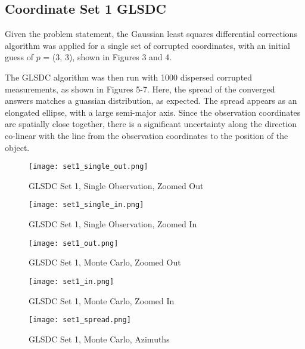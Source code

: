 \documentclass{article}
\begin{document}
\subsection{Coordinate Set 1 GLSDC}
Given the problem statement, the Gaussian least squares differential corrections algorithm was applied for a single set of corrupted coordinates, with an initial guess of \textbf{$p$} = (3, 3), shown in Figures 3 and 4. 
\par The GLSDC algorithm was then run with 1000 dispersed corrupted measurements, as shown in Figures 5-7. Here, the spread of the converged answers matches a guassian distribution, as expected. The spread appears as an elongated ellipse, with a large semi-major axis. Since the observation coordinates are spatially close together, there is a significant uncertainty along the direction co-linear with the line from the observation coordinates to the position of the object.

\begin{figure}[h]
    \centering
    \texttt{[image: set1\_single\_out.png]}
    \caption{GLSDC Set 1, Single Observation, Zoomed Out}
    \label{fig:enter-label}
\end{figure}

\begin{figure}[h]
    \centering
    \texttt{[image: set1\_single\_in.png]}
    \caption{GLSDC Set 1, Single Observation, Zoomed In}
    \label{fig:enter-label}
\end{figure}

\begin{figure}[h]
    \centering
    \texttt{[image: set1\_out.png]}
    \caption{GLSDC Set 1, Monte Carlo, Zoomed Out}
    \label{fig:enter-label}
\end{figure}

\begin{figure}[h]
    \centering
    \texttt{[image: set1\_in.png]}
    \caption{GLSDC Set 1, Monte Carlo, Zoomed In}
    \label{fig:enter-label}
\end{figure}

\begin{figure}[h]
    \centering
    \texttt{[image: set1\_spread.png]}
    \caption{GLSDC Set 1, Monte Carlo, Azimuths}
    \label{fig:enter-label}
\end{figure}

\clearpage
\end{document}
